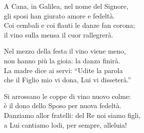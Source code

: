 

\spazio

\strofa A Cana, in Galilea, nel nome del Signore,\\
gli sposi han giurato amore e fedeltà.\\
Coi cembali e coi flauti le danze fan corona;\\
il vino sulla mensa il cuor rallegrerà.

\spazio


\spazio

\strofa Nel mezzo della festa il vino viene meno,\\
non hanno più la gioia: la danza finirà.\\
La madre dice ai servi: ``Udite la parola\\
che il Figlio mio vi dona, Lui vi disseterà.''

\spazio


\spazio

\strofa Si arrossano le coppe di vino nuovo colme:\\
è il dono dello Sposo per nuova fedeltà.\\
Danziamo allor fratelli: del Re noi siamo figli,\\
a Lui cantiamo lodi, per sempre, alleluia!

\spazio


\spazio

